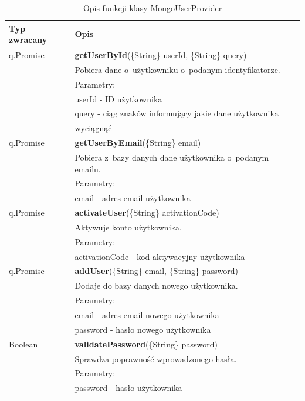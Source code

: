 \documentclass[8pt,a4paper,notitlepage]{article}
\begin{document}
\begin{center}
\begin{table}[H]
\caption{Opis funkcji klasy MongoUserProvider}
  \begin{tabular}{| l| l|}%
    \hline
    Typ zwracany & Opis \\ \hline \hline
  	q.Promise	&	\textbf{getUserById}(\{String\} userId, \{String\} query) \\
 &  Pobiera dane o~użytkowniku o~podanym identyfikatorze. \\ 
 & Parametry: \\
 & userId - ID użytkownika \\
 & query - ciąg znaków informujący jakie dane użytkownika \\ & wyciągnąć \\ 
 \hline

q.Promise	&	\textbf{getUserByEmail}(\{String\} email) \\
 &  Pobiera z~bazy danych dane użytkownika o~podanym emailu.\\ 
 & Parametry: \\
 & email - adres email użytkownika\\ 
\hline
   
q.Promise	&	\textbf{activateUser}(\{String\} activationCode) \\
 &  Aktywuje konto użytkownika.\\ 
 & Parametry: \\
 & activationCode - kod aktywacyjny użytkownika \\ 
 \hline

q.Promise	&	\textbf{addUser}(\{String\} email, \{String\} password) \\
 &  Dodaje do bazy danych nowego użytkownika.\\ 
 & Parametry: \\
 & email - adres email nowego użytkownika \\
 & password - hasło nowego użytkownika \\ 
 \hline

Boolean	&	\textbf{validatePassword}(\{String\} password) \\
 &  Sprawdza poprawność wprowadzonego hasła.\\ 
 & Parametry: \\
 & password - hasło  użytkownika \\ 
 \hline
 
  \end{tabular}
\end{table}
\end{center}
\end{document}
